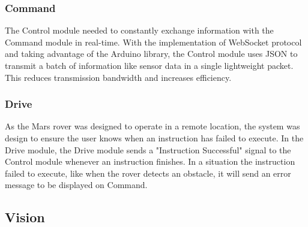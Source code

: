 \documentclass[11pt, a4paper]{article}
\begin{document}
\subsubsection{Command}

The Control module needed to constantly exchange information with the Command module in real-time. With the implementation of WebSocket protocol and taking advantage of the Arduino library, the Control module uses JSON to transmit a batch of information like sensor data in a single lightweight packet. This reduces transmission bandwidth and increases efficiency.

\subsubsection{Drive}

As the Mars rover was designed to operate in a remote location, the system was design to ensure the user knows when an instruction has failed to execute. In the Drive module, the Drive module sends a "Instruction Successful" signal to the Control module whenever an instruction finishes. In a situation the instruction failed to execute, like when the rover detects an obstacle, it will send an error message to be displayed on Command.

\pagebreak
\subsection{Vision}
\end{document}
